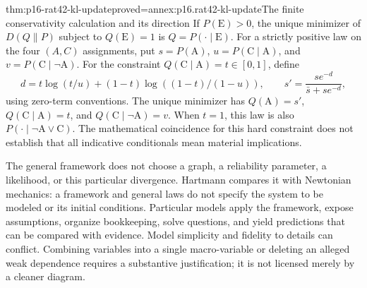 \begin{hbtheorem}{thm:p16-rat42-kl-update}{proved=annex:p16.rat42-kl-update}{The finite conservativity calculation and its direction}
If \(P(\mathrm E)>0\), the unique minimizer of \(D(Q\|P)\)
subject to \(Q(\mathrm E)=1\) is \(Q=P(\cdot\mid\mathrm E)\).
For a strictly positive law on the four \((A,C)\) assignments, put
\(s=P(\mathrm A)\), \(u=P(\mathrm C\mid\mathrm A)\), and
\(v=P(\mathrm C\mid\neg\mathrm A)\). For the constraint
\(Q(\mathrm C\mid\mathrm A)=t\in[0,1]\), define
\[
 d=t\log(t/u)+(1-t)\log((1-t)/(1-u)),
 \qquad
 s'=\frac{s e^{-d}}{\bar s+s e^{-d}},
\]
using zero-term conventions. The unique minimizer has
\(Q(\mathrm A)=s'\), \(Q(\mathrm C\mid\mathrm A)=t\),
and \(Q(\mathrm C\mid\neg\mathrm A)=v\).
When \(t=1\), this law is also
\(P(\cdot\mid\neg\mathrm A\lor\mathrm C)\).
The mathematical coincidence for this hard constraint does not establish
that all indicative conditionals mean material implications.
\end{hbtheorem}

The general framework does not choose a graph, a reliability parameter,
a likelihood, or this particular divergence. Hartmann compares it with
Newtonian mechanics: a framework and general laws do not specify the
system to be modeled or its initial conditions. Particular models apply
the framework, expose assumptions, organize bookkeeping, solve questions,
and yield predictions that can be compared with evidence. Model simplicity
and fidelity to details can conflict. Combining variables into a single
macro-variable or deleting an alleged weak dependence requires a substantive
justification; it is not licensed merely by a cleaner diagram.
\cite[Secs.~3.1--3.2, pp.~256--257]{Hartmann2021BayesNets}


